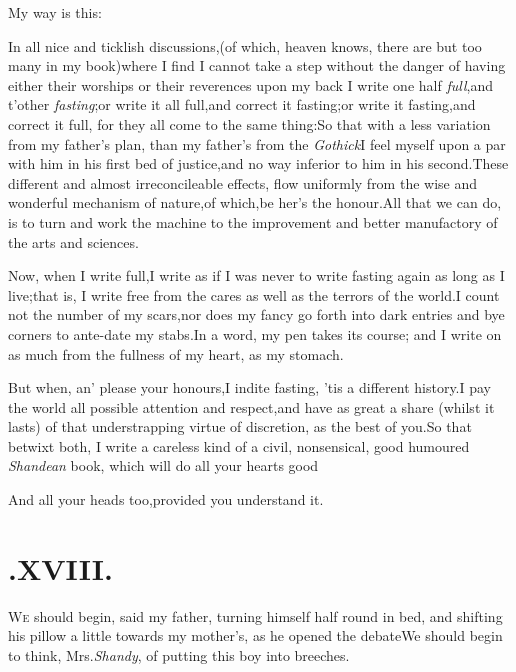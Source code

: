 \documentclass{article}
\begin{document}
My way is this:\tsh

In all nice and ticklish discussions,\tsk (of which, heaven
knows, there are but too many in my book)\tsk where I find I
cannot take a step without the danger of having either their
worships or their reverences upon my back\tsh\break
I write one half \textit{full},\tsk and t’other
\textit{fasting};\tsh or write it all full,\tsk and
correct it fasting;\tsh or write it fasting,\tsk and
correct it full, for they all come to the same
thing:\tsh So that with a less variation from my
father’s plan, than my father’s from the
\textit{Gothick}\tsk I feel myself upon a par with him in his first
bed of justice,\tsk and no way inferior to him in his
second.\tsh These different and almost irreconcileable
effects, flow uniformly from the wise and wonderful mechanism of
nature,\tsk of which,\tsk be her’s the
honour.\tsh All that we can do, is to turn and work the
machine to the improvement and better manufactory of the arts and
sciences.\tsh

Now, when I write full,\tsk I write as if I was never to write
fasting again as long as I live;\tsh that is, I write free
from the cares as well as the terrors of the
world.\tsh I count not the number of my scars,\tsk nor
does my fancy go forth into dark entries and bye corners to
ante-date my stabs.\tsh In a word, my pen takes its
course; and I write on as much from the fullness of my heart, as my\break
stomach.\tsh

But when, an’ please your honours,\break I indite fasting, ’tis
a different history.\break\tsh I pay the world all possible
attention and respect,\tsk and have as great a share (whilst it
lasts) of that understrap\-ping virtue of discretion, as the best
of you.\tsh So that betwixt both, I write a careless kind of a
civil, nonsensical, good humoured \textit{Shandean} book, which
will do all your hearts good\tsh

\tsh And all your heads too,\tsk provided you
understand it.

\vfill{}\eject
\section{.\enspace XVIII.}

\lettrine{W}{e} should begin, said my father,
turning himself half round in bed, and shifting his pillow a little
towards my mother’s, as he opened the debate\tsh We
should begin to think, Mrs.\@ \textit{Shandy}, of putting this boy into
breeches.\tsh
\end{document}
